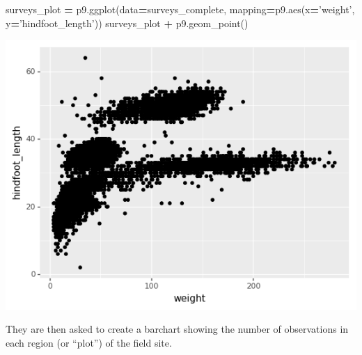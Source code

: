 \documentclass[
]{book}
\newenvironment{Shaded}{\begin{snugshade}}{\end{snugshade}}
\newcommand{\NormalTok}[1]{#1}
\newcommand{\OperatorTok}[1]{\textcolor[rgb]{0.81,0.36,0.00}{\textbf{#1}}}
\newcommand{\StringTok}[1]{\textcolor[rgb]{0.31,0.60,0.02}{#1}}
\begin{document}
\begin{Shaded}
\begin{Highlighting}[]
\NormalTok{surveys_plot }\OperatorTok{=}\NormalTok{ p9.ggplot(data}\OperatorTok{=}\NormalTok{surveys_complete,}
\NormalTok{                         mapping}\OperatorTok{=}\NormalTok{p9.aes(x}\OperatorTok{=}\StringTok{'weight'}\NormalTok{, y}\OperatorTok{=}\StringTok{'hindfoot_length'}\NormalTok{))}
\NormalTok{surveys_plot }\OperatorTok{+}\NormalTok{ p9.geom_point()}
\end{Highlighting}
\end{Shaded}

\includegraphics[width=7.82in]{./figures/python_scatterplot_example}

They are then asked to create a barchart showing the number of observations in each region
(or ``plot'') of the field site.
\end{document}
